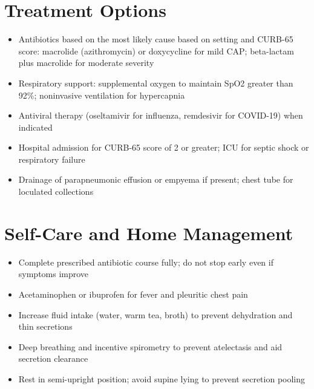 \section*{Treatment Options}
\begin{itemize}
  \item Antibiotics based on the most likely cause based on setting and CURB-65 score: macrolide (azithromycin) or doxycycline for mild CAP; beta-lactam plus macrolide for moderate severity
  \item Respiratory support: supplemental oxygen to maintain SpO2 greater than 92\%; noninvasive ventilation for hypercapnia
  \item Antiviral therapy (oseltamivir for influenza, remdesivir for COVID-19) when indicated
  \item Hospital admission for CURB-65 score of 2 or greater; ICU for septic shock or respiratory failure
  \item Drainage of parapneumonic effusion or empyema if present; chest tube for loculated collections
\end{itemize}

\section*{Self-Care and Home Management}
\begin{itemize}
  \item Complete prescribed antibiotic course fully; do not stop early even if symptoms improve
  \item Acetaminophen or ibuprofen for fever and pleuritic chest pain
  \item Increase fluid intake (water, warm tea, broth) to prevent dehydration and thin secretions
  \item Deep breathing and incentive spirometry to prevent atelectasis and aid secretion clearance
  \item Rest in semi-upright position; avoid supine lying to prevent secretion pooling
\end{itemize}

